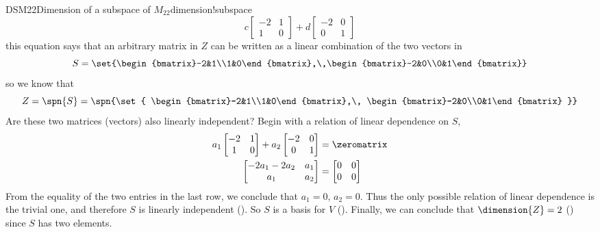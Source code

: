 \begin{example}{DSM22}{Dimension of a subspace of $M_{22}$}{dimension!subspace}
\begin{equation*}
%
c\begin{bmatrix}-2&1\\1&0\end{bmatrix}+
d\begin{bmatrix}-2&0\\0&1\end{bmatrix}
%
\end{equation*}
%
this equation says that an arbitrary matrix in $Z$ can be written as a linear combination of the two vectors in
%
\begin{equation*}
S=\set{\begin{bmatrix}-2&1\\1&0\end{bmatrix},\,\begin{bmatrix}-2&0\\0&1\end{bmatrix}}
\end{equation*}
%
so we know that 
%
\begin{equation*}
Z=\spn{S}=
\spn{\set{
\begin{bmatrix}-2&1\\1&0\end{bmatrix},\,
\begin{bmatrix}-2&0\\0&1\end{bmatrix}
}}
\end{equation*}
%
Are these two matrices (vectors) also linearly independent?  Begin with a relation of linear dependence on $S$,
%
\begin{align*}
a_1\begin{bmatrix}-2&1\\1&0\end{bmatrix}+
a_2\begin{bmatrix}-2&0\\0&1\end{bmatrix}&=\zeromatrix\\
\begin{bmatrix}-2a_1-2a_2&a_1\\a_1&a_2\end{bmatrix}&=
\begin{bmatrix}0&0\\0&0\end{bmatrix}
\end{align*}
%
From the equality of the two entries in the last row, we conclude that $a_1=0$, $a_2=0$.  Thus the only possible relation of linear dependence is the trivial one, and therefore $S$ is linearly independent ().  So $S$ is a basis for $V$ ().  Finally, we can conclude that $\dimension{Z}=2$ () since $S$ has two elements.
%
\end{example}
